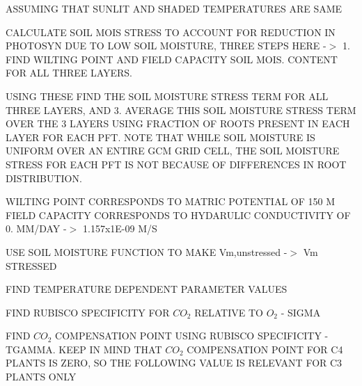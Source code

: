 A\+S\+S\+U\+M\+I\+N\+G T\+H\+A\+T S\+U\+N\+L\+I\+T A\+N\+D S\+H\+A\+D\+E\+D T\+E\+M\+P\+E\+R\+A\+T\+U\+R\+E\+S A\+R\+E S\+A\+M\+E

C\+A\+L\+C\+U\+L\+A\+T\+E S\+O\+I\+L M\+O\+I\+S S\+T\+R\+E\+S\+S T\+O A\+C\+C\+O\+U\+N\+T F\+O\+R R\+E\+D\+U\+C\+T\+I\+O\+N I\+N P\+H\+O\+T\+O\+S\+Y\+N D\+U\+E T\+O L\+O\+W S\+O\+I\+L M\+O\+I\+S\+T\+U\+R\+E, T\+H\+R\+E\+E S\+T\+E\+P\+S H\+E\+R\+E -\/$>$ 1. F\+I\+N\+D W\+I\+L\+T\+I\+N\+G P\+O\+I\+N\+T A\+N\+D F\+I\+E\+L\+D C\+A\+P\+A\+C\+I\+T\+Y S\+O\+I\+L M\+O\+I\+S. C\+O\+N\+T\+E\+N\+T F\+O\+R A\+L\+L T\+H\+R\+E\+E L\+A\+Y\+E\+R\+S.
\begin{DoxyEnumerate}
\item U\+S\+I\+N\+G T\+H\+E\+S\+E F\+I\+N\+D T\+H\+E S\+O\+I\+L M\+O\+I\+S\+T\+U\+R\+E S\+T\+R\+E\+S\+S T\+E\+R\+M F\+O\+R A\+L\+L T\+H\+R\+E\+E L\+A\+Y\+E\+R\+S, A\+N\+D 3. A\+V\+E\+R\+A\+G\+E T\+H\+I\+S S\+O\+I\+L M\+O\+I\+S\+T\+U\+R\+E S\+T\+R\+E\+S\+S T\+E\+R\+M O\+V\+E\+R T\+H\+E 3 L\+A\+Y\+E\+R\+S U\+S\+I\+N\+G F\+R\+A\+C\+T\+I\+O\+N O\+F R\+O\+O\+T\+S P\+R\+E\+S\+E\+N\+T I\+N E\+A\+C\+H L\+A\+Y\+E\+R F\+O\+R E\+A\+C\+H P\+F\+T. N\+O\+T\+E T\+H\+A\+T W\+H\+I\+L\+E S\+O\+I\+L M\+O\+I\+S\+T\+U\+R\+E I\+S U\+N\+I\+F\+O\+R\+M O\+V\+E\+R A\+N E\+N\+T\+I\+R\+E G\+C\+M G\+R\+I\+D C\+E\+L\+L, T\+H\+E S\+O\+I\+L M\+O\+I\+S\+T\+U\+R\+E S\+T\+R\+E\+S\+S F\+O\+R E\+A\+C\+H P\+F\+T I\+S N\+O\+T B\+E\+C\+A\+U\+S\+E O\+F D\+I\+F\+F\+E\+R\+E\+N\+C\+E\+S I\+N R\+O\+O\+T D\+I\+S\+T\+R\+I\+B\+U\+T\+I\+O\+N.
\end{DoxyEnumerate}

W\+I\+L\+T\+I\+N\+G P\+O\+I\+N\+T C\+O\+R\+R\+E\+S\+P\+O\+N\+D\+S T\+O M\+A\+T\+R\+I\+C P\+O\+T\+E\+N\+T\+I\+A\+L O\+F 150 M F\+I\+E\+L\+D C\+A\+P\+A\+C\+I\+T\+Y C\+O\+R\+R\+E\+S\+P\+O\+N\+D\+S T\+O H\+Y\+D\+A\+R\+U\+L\+I\+C C\+O\+N\+D\+U\+C\+T\+I\+V\+I\+T\+Y O\+F 0. M\+M/\+D\+A\+Y -\/$>$ 1.\+157x1\+E-\/09 M/\+S

U\+S\+E S\+O\+I\+L M\+O\+I\+S\+T\+U\+R\+E F\+U\+N\+C\+T\+I\+O\+N T\+O M\+A\+K\+E Vm,unstressed -\/$>$ Vm S\+T\+R\+E\+S\+S\+E\+D

F\+I\+N\+D T\+E\+M\+P\+E\+R\+A\+T\+U\+R\+E D\+E\+P\+E\+N\+D\+E\+N\+T P\+A\+R\+A\+M\+E\+T\+E\+R V\+A\+L\+U\+E\+S

F\+I\+N\+D R\+U\+B\+I\+S\+C\+O S\+P\+E\+C\+I\+F\+I\+C\+I\+T\+Y F\+O\+R $CO_2$ R\+E\+L\+A\+T\+I\+V\+E T\+O $O_2$ -\/ S\+I\+G\+M\+A

F\+I\+N\+D $CO_2$ C\+O\+M\+P\+E\+N\+S\+A\+T\+I\+O\+N P\+O\+I\+N\+T U\+S\+I\+N\+G R\+U\+B\+I\+S\+C\+O S\+P\+E\+C\+I\+F\+I\+C\+I\+T\+Y -\/ T\+G\+A\+M\+M\+A. K\+E\+E\+P I\+N M\+I\+N\+D T\+H\+A\+T $CO_2$ C\+O\+M\+P\+E\+N\+S\+A\+T\+I\+O\+N P\+O\+I\+N\+T F\+O\+R C4 P\+L\+A\+N\+T\+S I\+S Z\+E\+R\+O, S\+O T\+H\+E F\+O\+L\+L\+O\+W\+I\+N\+G V\+A\+L\+U\+E I\+S R\+E\+L\+E\+V\+A\+N\+T F\+O\+R C3 P\+L\+A\+N\+T\+S O\+N\+L\+Y

